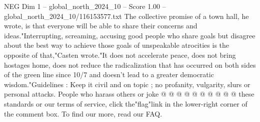 \begin{textsample}{NEG Dim 1 – global\_north\_2024\_10 – Score 1.00 – global\_north\_2024\_10/116153577.txt}
The collective promise of a town hall, he wrote, is that everyone will be able to share their concerns and ideas."Interrupting, screaming, accusing good people who share goals but disagree about the best way to achieve those goals of unspeakable atrocities is the opposite of that,"Casten wrote."It does not accelerate peace, does not bring hostages home, does not reduce the radicalization that has occurred on both sides of the green line since 10/7 and doesn't lead to a greater democratic wisdom."Guidelines : Keep it civil and on topic ; no profanity, vulgarity, slurs or personal attacks.
People who harass others or joke @ @ @ @ @ @ @ @ @ @ these standards or our terms of service, click the"flag"link in the lower-right corner of the comment box.
To find our more, read our FAQ.

\end{textsample}
